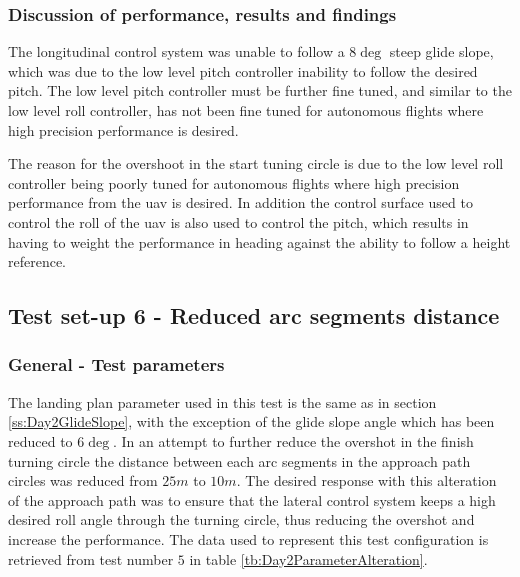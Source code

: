 \subsubsection{Discussion of performance, results and findings}
The longitudinal control system was unable to follow a $8 \deg$ steep glide slope, which was due to the low level pitch controller inability to follow the desired pitch. The low level pitch controller must be further fine tuned, and similar to the low level roll controller, has not been fine tuned for autonomous flights where high precision performance is desired.

The reason for the overshoot in the start tuning circle is due to the low level roll controller being poorly tuned for autonomous flights where high precision performance from the \gls{uav} is desired. In addition the control surface used to control the roll of the \gls{uav} is also used to control the pitch, which results in having to weight the performance in heading against the ability to follow a height reference.
\subsection{Test set-up 6 - Reduced arc segments distance}\label{ss:Day2ArcDistance}
\subsubsection{General - Test parameters}
The landing plan parameter used in this test is the same as in section \ref{ss:Day2GlideSlope}, with the exception of the glide slope angle which has been reduced to $6 \deg$. In an attempt to further reduce the overshot in the finish turning circle the distance between each arc segments in the approach path circles was reduced from $25 m$ to $10 m$. The desired response with this alteration of the approach path was to ensure that the lateral control system keeps a high desired roll angle through the turning circle, thus reducing the overshot and increase the performance. The data used to represent this test configuration is retrieved from test number $5$ in table \ref{tb:Day2ParameterAlteration}.
